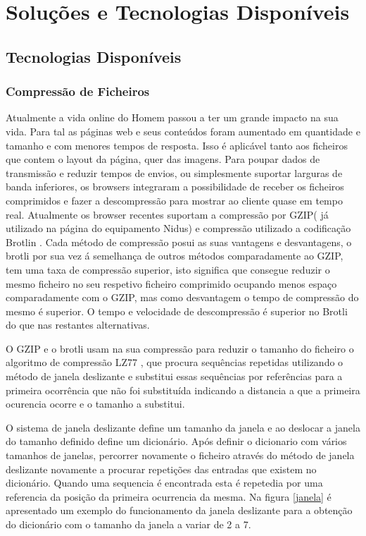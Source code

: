 \section{Soluções e Tecnologias Disponíveis} \label{solucoesDisponiveis}
\subsection{Tecnologias Disponíveis}
\subsubsection{Compressão de Ficheiros}
\par
Atualmente a vida online do Homem passou a ter um grande impacto na sua vida. Para tal as páginas web e seus conteúdos foram aumentado em quantidade e tamanho e com menores tempos de resposta. Isso é aplicável tanto aos ficheiros que contem o layout da página, quer das imagens. Para poupar dados de transmissão e reduzir tempos de envios, ou simplesmente suportar larguras de banda inferiores, os browsers integraram a possibilidade de receber os ficheiros comprimidos e fazer a descompressão para mostrar ao cliente quase em tempo real. Atualmente os browser recentes suportam a compressão por GZIP( já utilizado na página do equipamento Nidus) e compressão utilizado a codificação Brotlin \cite{Alakuijala2019} \cite{brotlirfc}.
Cada método de compressão posui as suas vantagens e desvantagens, o brotli por sua vez á semelhança de outros métodos comparadamente ao GZIP, tem uma taxa de compressão superior\cite{Alakuijala2015}, isto significa que consegue reduzir o mesmo ficheiro no seu respetivo ficheiro comprimido ocupando menos espaço comparadamente com o GZIP, mas como desvantagem o tempo de compressão do mesmo é superior. O tempo e velocidade de descompressão é superior no Brotli do que nas restantes alternativas.
\par
O GZIP e o brotli usam na sua compressão para reduzir o tamanho do ficheiro o algoritmo de compressão LZ77 , que procura sequências repetidas utilizando o método de janela deslizante e substitui essas sequências por referências para a primeira ocorrência que não foi substituída indicando a distancia a que a primeira ocurencia ocorre e o tamanho a substitui.
\par O sistema de janela deslizante define um tamanho da janela e ao deslocar a janela do tamanho definido define um dicionário. Após definir o dicionario com vários tamanhos de janelas, percorrer novamente o ficheiro através do método de janela deslizante novamente a procurar repetições das entradas que existem no dicionário. Quando uma sequencia é encontrada esta é repetedia por uma referencia da posição da primeira ocurrencia da mesma. Na figura \ref{janela} é apresentado um exemplo do funcionamento da janela deslizante para a obtenção do dicionário com o tamanho da janela a variar de 2 a 7.
